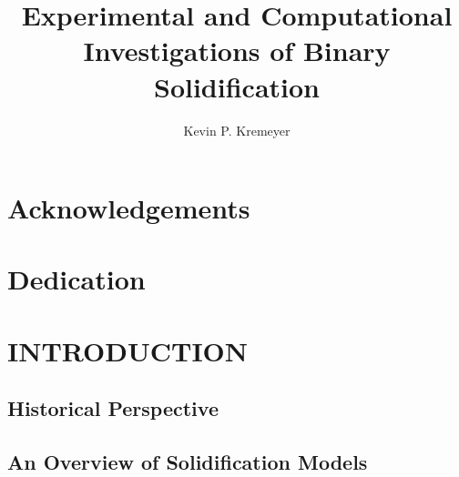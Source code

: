 \documentclass{article}
\title{Experimental and Computational Investigations of Binary Solidification}
\author{Kevin P. Kremeyer}
\begin{document}
\maketitle

\chapter*{Acknowledgements}


\chapter*{Dedication}

%
%
\tableofcontents
\listoftables
\listoffigures
%
% 
\begin{abstract}
  
\end{abstract}
%
% 
\chapter{ INTRODUCTION } 
\label{intro} 
\markright{} 

\section{Historical Perspective}
\label{intro_hist}


\section{An Overview of Solidification Models}
\label{intro_models}

%
\end{document}
